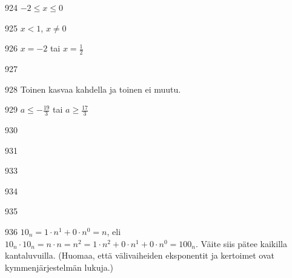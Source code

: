 \begin{Vastaus}{924}
$-2 \leq x \leq 0$
\end{Vastaus}
\begin{Vastaus}{925}
$x<1$, $x\neq0$
\end{Vastaus}
\begin{Vastaus}{926}
$x=-2$ tai $x=\frac{1}{2}$
\end{Vastaus}
\begin{Vastaus}{927}
    
\end{Vastaus}
\begin{Vastaus}{928}
     Toinen kasvaa kahdella ja toinen ei muutu.
    
\end{Vastaus}
\begin{Vastaus}{929}
$a \leq -\frac{19}{3}$ tai $a \geq \frac{17}{3}$
\end{Vastaus}
\begin{Vastaus}{930}
\end{Vastaus}
\begin{Vastaus}{931}
\end{Vastaus}
\begin{Vastaus}{933}
	
\end{Vastaus}
\begin{Vastaus}{934}
\end{Vastaus}
\begin{Vastaus}{935}
\end{Vastaus}
\begin{Vastaus}{936}
$10_n=1\cdot n^1+0\cdot n^0=n$, eli $10_n \cdot 10_n =n\cdot n = n^2= 1\cdot n^2 + 0 \cdot n^1 + 0\cdot n^0 =100_n$. Väite siis pätee kaikilla kantaluvuilla. (Huomaa, että välivaiheiden eksponentit ja kertoimet ovat kymmenjärjestelmän lukuja.)
	
\end{Vastaus}
